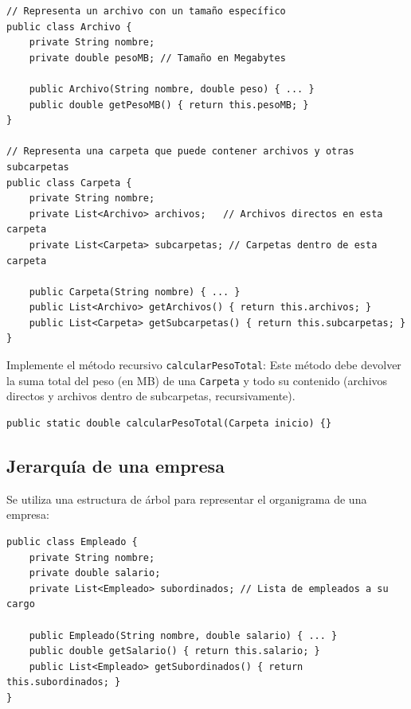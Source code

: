 \documentclass[a4paper]{article}
\newcommand{\code}[1]{\texttt{#1}}
\begin{document}
\begin{verbatim}
// Representa un archivo con un tamaño específico
public class Archivo {
    private String nombre;
    private double pesoMB; // Tamaño en Megabytes

    public Archivo(String nombre, double peso) { ... }
    public double getPesoMB() { return this.pesoMB; }
}

// Representa una carpeta que puede contener archivos y otras subcarpetas
public class Carpeta {
    private String nombre;
    private List<Archivo> archivos;   // Archivos directos en esta carpeta
    private List<Carpeta> subcarpetas; // Carpetas dentro de esta carpeta

    public Carpeta(String nombre) { ... }
    public List<Archivo> getArchivos() { return this.archivos; }
    public List<Carpeta> getSubcarpetas() { return this.subcarpetas; }
}
\end{verbatim}

Implemente el método recursivo \code{calcularPesoTotal}: Este método debe devolver la suma total del peso (en MB) de una \code{Carpeta} y todo su contenido (archivos directos y archivos dentro de subcarpetas, recursivamente).

\begin{verbatim}
public static double calcularPesoTotal(Carpeta inicio) {}
\end{verbatim}

\subsection{Jerarquía de una empresa}

Se utiliza una estructura de árbol para representar el organigrama de una empresa:

\begin{verbatim}
public class Empleado {
    private String nombre;
    private double salario;
    private List<Empleado> subordinados; // Lista de empleados a su cargo

    public Empleado(String nombre, double salario) { ... }
    public double getSalario() { return this.salario; }
    public List<Empleado> getSubordinados() { return this.subordinados; }
}
\end{verbatim}
\end{document}
